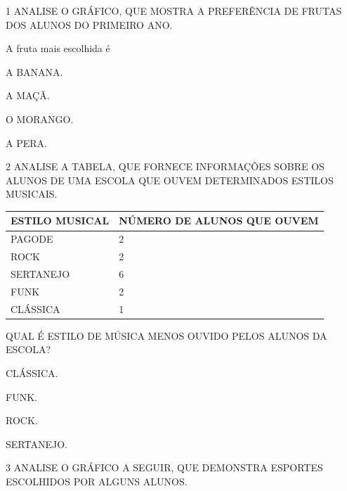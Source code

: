 
\num{1} ANALISE O GRÁFICO, QUE MOSTRA A PREFERÊNCIA DE FRUTAS DOS ALUNOS DO PRIMEIRO ANO.


A fruta mais escolhida é

\begin{escolha}
\item A BANANA.

\item A MAÇÃ.

\item O MORANGO.

\item A PERA.
\end{escolha}


\num{2} ANALISE A TABELA, QUE FORNECE INFORMAÇÕES SOBRE OS ALUNOS DE UMA ESCOLA QUE OUVEM DETERMINADOS ESTILOS MUSICAIS.

\begin{longtable}[]{@{}ll@{}}
\toprule
ESTILO MUSICAL & NÚMERO DE ALUNOS QUE OUVEM\tabularnewline
\midrule
\endhead
PAGODE & 2\tabularnewline
ROCK & 2\tabularnewline
SERTANEJO & 6\tabularnewline
FUNK & 2\tabularnewline
CLÁSSICA & 1\tabularnewline
\bottomrule
\end{longtable}

QUAL É ESTILO DE MÚSICA MENOS OUVIDO PELOS ALUNOS DA ESCOLA?

\begin{escolha}
\item CLÁSSICA.

\item FUNK.

\item ROCK.

\item SERTANEJO.
\end{escolha}



\num{3} ANALISE O GRÁFICO A SEGUIR, QUE DEMONSTRA ESPORTES ESCOLHIDOS POR ALGUNS ALUNOS.

